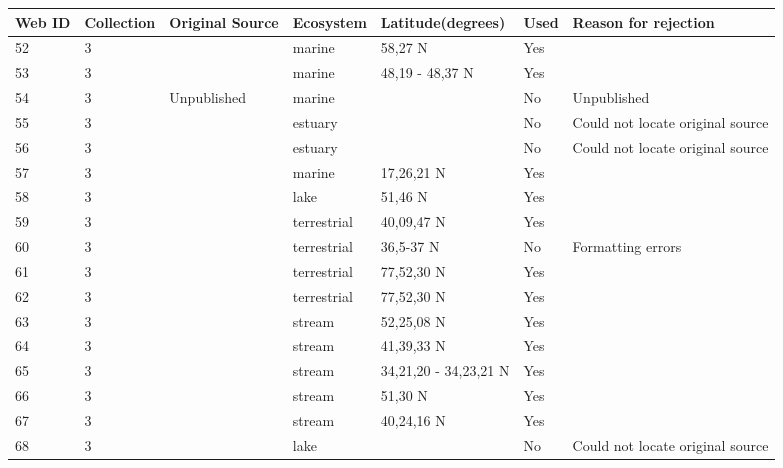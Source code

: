 \documentclass[12pt]{article}
\begin{document}
\begin{landscape}
        \newpage

    \begin{table}[h!]
    \centering
    {\footnotesize
      \begin{tabular}{p{2.8cm}p{1.3cm}p{3cm}p{2.2cm}p{2.5cm}lp{8.2cm}}
        \hline
        Web ID & Collection & Original Source & Ecosystem & Latitude(degrees) & Used  & Reason for rejection  \\
        \hline
        52    & 3 & \cite{Paine1980a}    & marine & 58,27 N & Yes   &       \\
        53    & 3 & \cite{Paine1980a}    & marine & 48,19 - 48,37 N & Yes   &       \\
        54    & 3 & Unpublished  & marine &       & No    & Unpublished \\
        55    & 3 & \cite{Milne1972}  & estuary &       & No    & Could not locate original source \\
        56    & 3 & \cite{Milne1972}  & estuary &       & No    & Could not locate original source \\
        57    & 3 & \cite{Yanez1978}  & marine & 17,26,21 N & Yes   &       \\
        58    & 3 & \cite{Smirnov1961}  & lake & 51,46 N & Yes   &       \\
        59    & 3 & \cite{Twomey1945}    & terrestrial & 40,09,47 N & Yes   &       \\
        60    & 3 & \cite{Rasmussen1941}    & terrestrial & 36,5-37 N & No  &  Formatting errors     \\
        61    & 3 & \cite{Summerhayes1928}  & terrestrial & 77,52,30 N & Yes   &       \\
        62    & 3 & \cite{Summerhayes1928}  & terrestrial & 77,52,30 N & Yes   &       \\
        63    & 3 & \cite{Jones1950}     & stream & 52,25,08 N & Yes   &       \\
        64    & 3 & \cite{Cummins1966}    & stream & 41,39,33 N & Yes   &       \\
        65    & 3 & \cite{Tsuda1972}  & stream & 34,21,20 - 34,23,21 N & Yes   &       \\
        66    & 3 & \cite{Mann1972a}  & stream & 51,30 N & Yes   &       \\
        67    & 3 & \cite{Carlson1968}    & stream & 40,24,16 N & Yes   &       \\
        68    & 3 & \cite{Morgan1972}  & lake &       & No    & Could not locate original source \\

\end{tabular}}
\end{table}
\end{landscape}
\end{document}
